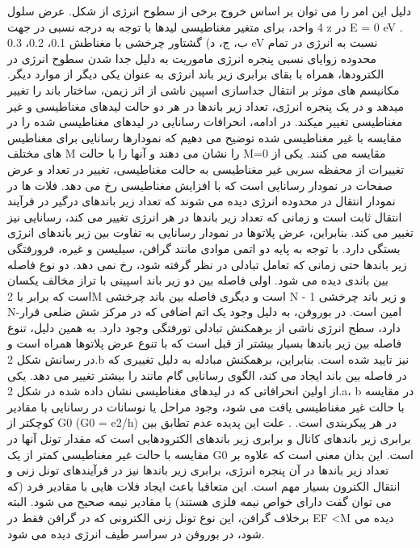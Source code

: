 دلیل این امر را می توان بر اساس خروج برخی از سطوح انرژی از شکل. عرض سلول 4 واحد، برای متغیر مغناطیسی لیدها با توجه به درجه نسبی در جهت z در E = 0 eV . ب، ج، د) گشتاور چرخشی با مغناطش 0.1، 0.2، 0.3 eV نسبت به انرژی در تمام محدوده زوایای نسبی پنجره انرژی ماموریت به دلیل جدا شدن سطوح انرژی در الکترودها، همراه با بقای برابری زیر باند انرژی به عنوان یکی دیگر از موارد دیگر. مکانیسم های موثر بر انتقال جداسازی اسپین ناشی از اثر زیمن، ساختار باند را تغییر میدهد و در یک پنجره انرژی، تعداد زیر باندها در هر دو حالت لیدهای مغناطیسی و غیر مغناطیسی تغییر میکند. در ادامه، انحرافات رسانایی در لیدهای مغناطیسی شده را در مقایسه با غیر مغناطیسی شده توضیح می دهیم که نمودارها رسانایی برای مغناطیس های مختلف M را نشان می دهند و آنها را با حالت M=0 مقایسه می کنند. یکی از تغییرات از محفظه سربی غیر مغناطیسی به حالت مغناطیسی، تغییر در تعداد و عرض صفحات در نمودار رسانایی است که با افزایش مغناطیسی رخ می دهد. فلات ها در نمودار انتقال در محدوده انرژی دیده می شوند که تعداد زیر باندهای درگیر در فرآیند انتقال ثابت است و زمانی که تعداد زیر باندها در هر انرژی تغییر می کند، رسانایی نیز تغییر می کند. بنابراین، عرض پلاتوها در نمودار رسانایی به تفاوت بین زیر باندهای انرژی بستگی دارد. با توجه به پایه دو اتمی موادی مانند گرافن، سیلیسن و غیره، فرورفتگی زیر باندها حتی زمانی که تعامل تبادلی در نظر گرفته شود، رخ نمی دهد. دو نوع فاصله بین باندی دیده می شود. اولی فاصله بین دو زیر باند اسپینی با تراز مخالف یکسان است که برابر با 2M است و دیگری فاصله بین باند چرخشی N - 1 و زیر باند چرخشی N-امین است. در بوروفن، به دلیل وجود یک اتم اضافی که در مرکز شش ضلعی قرار دارد، سطح انرژی ناشی از برهمکنش تبادلی تورفتگی وجود دارد. به همین دلیل، تنوع فاصله بین زیر باندها بسیار بیشتر از قبل است که با تنوع عرض پلاتوها همراه است و در رسانش شکل 2.b نیز تایید شده است. بنابراین، برهمکنش مبادله به دلیل تغییری که در فاصله بین باند ایجاد می کند، الگوی رسانایی گام مانند را بیشتر تغییر می دهد. یکی از اولین انحرافاتی که در لیدهای مغناطیسی نشان داده شده در شکل 2.a، b در مقایسه با حالت غیر مغناطیسی یافت می شود، وجود مراحل یا نوسانات در رسانایی با مقادیر کوچکتر از G0 (G0 = e2/h) در هر پیکربندی است. . علت این پدیده عدم تطابق بین برابری زیر باندهای کانال و برابری زیر باندهای الکترودهایی است که مقدار تونل آنها در مقایسه با حالت غیر مغناطیسی کمتر از یک G0 است. این بدان معنی است که علاوه بر تعداد زیر باندها در آن پنجره انرژی، برابری زیر باندها نیز در فرآیندهای تونل زنی و انتقال الکترون بسیار مهم است. این متعاقبا باعث ایجاد فلات هایی با مقادیر فرد (که می توان گفت دارای خواص نیمه فلزی هستند) یا مقادیر نیمه صحیح می شود. البته برخلاف گرافن، این نوع تونل زنی الکترونی که در گرافن فقط در EF <M دیده می شود، در بوروفن در سراسر طیف انرژی دیده می شود.
